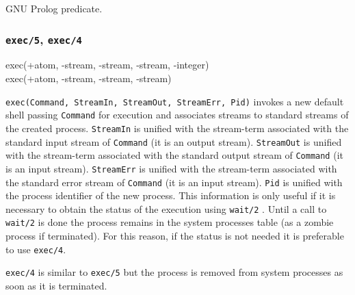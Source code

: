 GNU Prolog predicate.

\subsubsection{\texttt{exec/5},
               \texttt{exec/4}}

\begin{TemplatesOneCol}
exec(+atom, -stream, -stream, -stream, -integer)\\
exec(+atom, -stream, -stream, -stream)

\end{TemplatesOneCol}

\Description

\texttt{exec(Command, StreamIn, StreamOut, StreamErr, Pid)} invokes a new
default shell passing \texttt{Command} for execution and associates streams
to standard streams of the created process. \texttt{StreamIn} is unified
with the stream-term associated with the standard input stream of
\texttt{Command} (it is an output stream). \texttt{StreamOut} is unified
with the stream-term associated with the standard output stream of
\texttt{Command} (it is an input stream). \texttt{StreamErr} is unified with
the stream-term associated with the standard error stream of \texttt{Command}
(it is an input stream). \texttt{Pid} is unified with the process identifier
of the new process. This information is only useful if it is necessary to
obtain the status of the execution using \texttt{wait/2} .
Until a call to \texttt{wait/2} is done the process remains in the system
processes table (as a zombie process if terminated). For this reason, if the
status is not needed it is preferable to use \texttt{exec/4}.

\texttt{exec/4} is similar to \texttt{exec/5} but the process is removed
from system processes as soon as it is terminated.

\begin{PlErrors}








\end{PlErrors}


